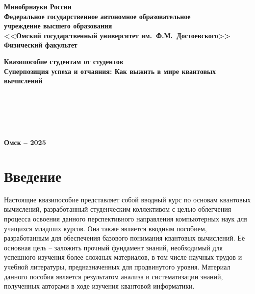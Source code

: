 \documentclass[12pt,a4paper]{article}
\begin{document}
	\begin{titlepage}
		\begin{center}
			{\large\bf {Минобрнауки России}\\[12pt]
				Федеральное государственное автономное образовательное \\
				учреждение высшего образования \\
				<<Омский государственный университет им.~Ф.М.~Достоевского>>\\[12pt]
				Физический факультет\\[12pt]
			}
			
			{\large\bf Квазипособие студентам от студентов }\\[12pt]
			{\Large\bf Суперпозиция успеха и отчаяния: Как выжить в мире квантовых вычислений }\\[2cm]
		\end{center}
		\vfill
		\hspace*{7cm}{\bf Составители:}\\[12pt]
		\hspace*{8cm}{\bf  Cтудент  Журавлева Анастасия }\\[12pt]
		\hspace*{8cm}{\bf  Cтудент Коцур Павел }\\[12pt]
		\hspace*{8cm}{\bf  Cтудент  Бахтин Артур}\\[1.5cm]	
		
		\begin{center}
			{\bf Омск -- 2025}
		\end{center}
	\end{titlepage}
	
	\addtocounter{page}{1}
	
	\tableofcontents
	\newpage
	
	\section*{Введение}	
	Настоящие квазипособие представляет собой вводный курс по основам квантовых вычислений, разработанный студенческим коллективом с целью облегчения процесса освоения данного перспективного направления компьютерных наук для учащихся младших курсов. Она также является вводным пособием, разработанным для обеспечения базового понимания квантовых вычислений. Её основная цель – заложить прочный фундамент знаний, необходимый для успешного изучения более сложных материалов, в том числе научных трудов и учебной литературы, предназначенных для продвинутого уровня. Материал данного пособия является результатом анализа и систематизации знаний, полученных авторами в ходе изучения квантовой информатики.\\
	
\end{document}
